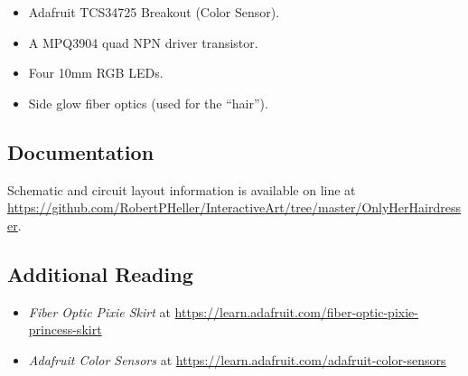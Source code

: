 \begin{itemize}
\item Adafruit TCS34725  Breakout (Color Sensor).
\item A MPQ3904 quad NPN driver transistor.
\item Four 10mm RGB LEDs.
\item Side glow fiber optics (used for the ``hair'').
\end{itemize}

\subsection*{Documentation}

Schematic and circuit layout information is available on line at 
\url{https://github.com/RobertPHeller/InteractiveArt/tree/master/OnlyHerHairdresser}.

\subsection*{Additional Reading}

\begin{itemize}
\item \textit{Fiber Optic Pixie Skirt} at 
\url{https://learn.adafruit.com/fiber-optic-pixie-princess-skirt} 
\item \textit{Adafruit Color Sensors} at 
\url{https://learn.adafruit.com/adafruit-color-sensors} 
\end{itemize}

